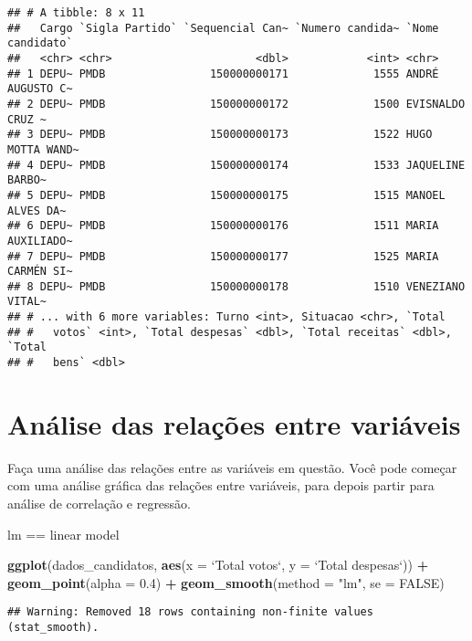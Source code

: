 \documentclass[]{article}
\newenvironment{Shaded}{\begin{snugshade}}{\end{snugshade}}
\newcommand{\KeywordTok}[1]{\textcolor[rgb]{0.13,0.29,0.53}{\textbf{#1}}}
\newcommand{\DataTypeTok}[1]{\textcolor[rgb]{0.13,0.29,0.53}{#1}}
\newcommand{\FloatTok}[1]{\textcolor[rgb]{0.00,0.00,0.81}{#1}}
\newcommand{\StringTok}[1]{\textcolor[rgb]{0.31,0.60,0.02}{#1}}
\newcommand{\OtherTok}[1]{\textcolor[rgb]{0.56,0.35,0.01}{#1}}
\newcommand{\OperatorTok}[1]{\textcolor[rgb]{0.81,0.36,0.00}{\textbf{#1}}}
\newcommand{\NormalTok}[1]{#1}
\begin{document}
\begin{verbatim}
## # A tibble: 8 x 11
##   Cargo `Sigla Partido` `Sequencial Can~ `Numero candida~ `Nome candidato`
##   <chr> <chr>                      <dbl>            <int> <chr>           
## 1 DEPU~ PMDB                150000000171             1555 ANDRÉ AUGUSTO C~
## 2 DEPU~ PMDB                150000000172             1500 EVISNALDO CRUZ ~
## 3 DEPU~ PMDB                150000000173             1522 HUGO MOTTA WAND~
## 4 DEPU~ PMDB                150000000174             1533 JAQUELINE BARBO~
## 5 DEPU~ PMDB                150000000175             1515 MANOEL ALVES DA~
## 6 DEPU~ PMDB                150000000176             1511 MARIA AUXILIADO~
## 7 DEPU~ PMDB                150000000177             1525 MARIA CARMÉN SI~
## 8 DEPU~ PMDB                150000000178             1510 VENEZIANO VITAL~
## # ... with 6 more variables: Turno <int>, Situacao <chr>, `Total
## #   votos` <int>, `Total despesas` <dbl>, `Total receitas` <dbl>, `Total
## #   bens` <dbl>
\end{verbatim}

\section{Análise das relações entre
variáveis}\label{analise-das-relacoes-entre-variaveis}

Faça uma análise das relações entre as variáveis em questão. Você pode
começar com uma análise gráfica das relações entre variáveis, para
depois partir para análise de correlação e regressão.

lm == linear model

\begin{Shaded}
\begin{Highlighting}[]
\KeywordTok{ggplot}\NormalTok{(dados_candidatos, }\KeywordTok{aes}\NormalTok{(}\DataTypeTok{x =} \StringTok{`}\DataTypeTok{Total votos}\StringTok{`}\NormalTok{, }\DataTypeTok{y =} \StringTok{`}\DataTypeTok{Total despesas}\StringTok{`}\NormalTok{)) }\OperatorTok{+}\StringTok{ }
\StringTok{  }\KeywordTok{geom_point}\NormalTok{(}\DataTypeTok{alpha =} \FloatTok{0.4}\NormalTok{) }\OperatorTok{+}\StringTok{ }\KeywordTok{geom_smooth}\NormalTok{(}\DataTypeTok{method =} \StringTok{"lm"}\NormalTok{, }\DataTypeTok{se =} \OtherTok{FALSE}\NormalTok{)}
\end{Highlighting}
\end{Shaded}

\begin{verbatim}
## Warning: Removed 18 rows containing non-finite values (stat_smooth).
\end{verbatim}
\end{document}
